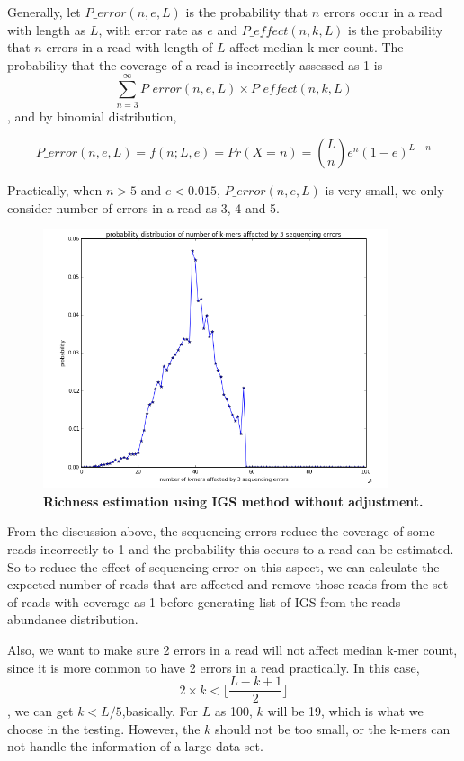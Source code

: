 Generally, let $P\_error(n,e,L)$ is the probability that $n$ errors occur in a 
read with length as $L$, with error rate as $e$ and $P\_effect(n,k,L)$ is the 
probability that $n$ 
errors in a read with length of $L$ affect median k-mer count. The probability 
that the coverage of a read is incorrectly assessed as 1 is 
\[\sum_{n=3}^{\infty} P\_error(n,e,L) \times P\_effect(n,k,L)  \],
and by binomial distribution,

\[P\_error(n,e,L) = f(n;L,e) = Pr(X=n) = {L \choose n}e^n(1-e)^{L-n} \] 

Practically, when $n>5$ and $e<0.015$, $P\_error(n,e,L)$ is very small, we only consider
number of errors in a read as 3, 4 and 5.

\begin{figure}[!ht]
 \centerline{\includegraphics[width=4in]{./figures/IGS_affected_k_kmers.png}}
\caption{\bf Richness estimation using IGS method without adjustment. }
\label{fig:IGS_affected_k_kmers}
\end{figure}

From the discussion above, the sequencing errors reduce the coverage of some
reads incorrectly to 1 and the probability this occurs to a read can be
estimated. So to reduce the effect of sequencing error on this aspect, we can
calculate the expected number of reads that are affected and remove those reads
from the set of reads with coverage as 1 before generating list of IGS from the
reads abundance distribution.

Also, we want to make sure 2 errors in a read will not affect median k-mer 
count, since it is more common to have 2 errors in a read practically. 
In this case, 
\[2 \times k < \lfloor \frac{L-k+1}{2}\rfloor \],
we can get $k<L/5$,basically. For $L$ as 100, $k$ will be 19, which is what we 
choose in the testing. However, the $k$ should not be too small, or the k-mers 
can not handle the information of a large data set.

